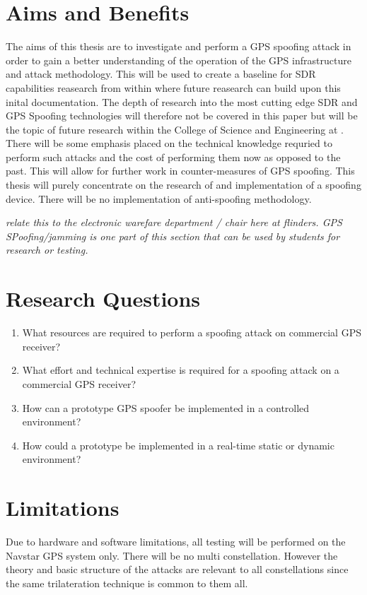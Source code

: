 \section{Aims and Benefits}\label{sec:Aims}
The aims of this thesis are to investigate and perform a GPS spoofing attack in order to gain a better understanding of the operation of the GPS infrastructure and attack
methodology. This will be used to create a baseline for SDR capabilities reasearch from within \univname where future reasearch can build upon this inital documentation.
The depth of research into the most cutting edge SDR and GPS Spoofing technologies will therefore not be covered in this paper but will be the topic of future research
within the College of Science and Engineering at \univname.
There will be some emphasis placed on the technical knowledge requried to perform such attacks and the cost of performing them now as opposed to the past. This will
allow for further work in counter-measures of GPS spoofing.
This thesis will purely concentrate on the research of and implementation of a spoofing device. There will be no implementation of anti-spoofing methodology.

\emph{relate this to the electronic warefare department / chair here at flinders. GPS SPoofing/jamming is one part of this section that can be used by students for research or testing.}

\section{Research Questions}\label{sec:RQs}
\begin{enumerate}
    \item What resources are required to perform a spoofing attack on commercial GPS receiver?
    \item What effort and technical expertise is required for a spoofing attack on a commercial GPS receiver?
    \item How can a prototype GPS spoofer be implemented in a controlled environment?
    \item How could a prototype be implemented in a real-time static or dynamic environment? 
\end{enumerate}

\section{Limitations}\label{sec:Limits}
Due to hardware and software limitations, all testing will be performed on the Navstar GPS system only. There will be no multi constellation. However the theory and basic
structure of the attacks are relevant to all constellations since the same trilateration technique is common to them all.

